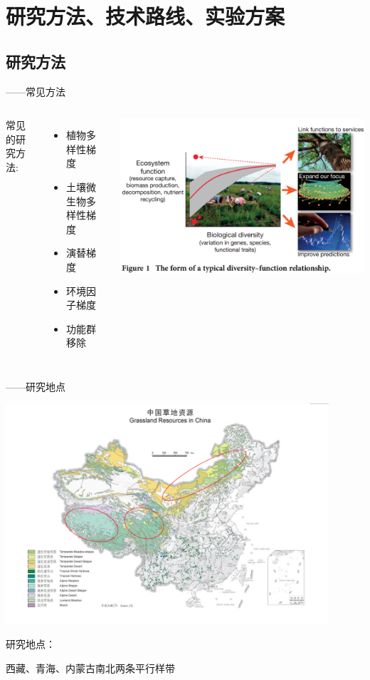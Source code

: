 \section{研究方法、技术路线、实验方案}
\subsection{研究方法}
\begin{frame}{\insertsubsection——常见方法}
	\begin{columns}
		常见的研究方法:
		\begin{itemize}
			\item<1-> 植物多样性梯度
			\item<2-> 土壤微生物多样性梯度
			\item<3-> 演替梯度
			\item<4-> 环境因子梯度
			\item<5-> 功能群移除			
		\end{itemize}
		\begin{center}
			\includegraphics[width = \textwidth]{./pic/2.1.1.png}
		\end{center}
	\end{columns}
\end{frame}
\begin{frame}{\insertsubsection——研究地点}
	\begin{center}
		\includegraphics[width = 0.9\textwidth]{./pic/2.1.2.png}
	\end{center}
	研究地点：
	
	西藏、青海、内蒙古南北两条平行样带
\end{frame}
